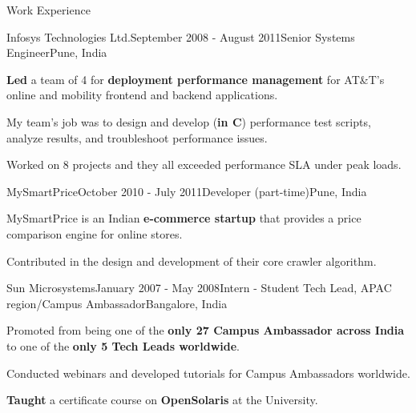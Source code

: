 \documentclass{resume} %
\begin{document}
\begin{rSection}{Work Experience}
\begin{rSubsection}{Infosys Technologies Ltd.}{September 2008 - August
2011}{Senior Systems Engineer}{Pune, India}
\item \textbf{Led} a team of 4 for \textbf{deployment performance management}
for AT\&T's online and mobility frontend and backend applications.
\begin{lsubSubsection}
\item My team's job was to design and develop (\textbf{in C}) performance
test scripts, analyze results, and troubleshoot performance issues.  
\item {Worked on 8 projects} and they all exceeded performance SLA under
peak loads.
\end{lsubSubsection}
\end{rSubsection}

\begin{rSubsection}{MySmartPrice}{October 2010 - July 2011}{Developer
(part-time)}{Pune, India} 
\item MySmartPrice is an Indian \textbf{e-commerce startup} that provides a
price comparison engine for online stores. 
\begin{lsubSubsection}
\item Contributed in the design and development of their core crawler algorithm. 
\end{lsubSubsection}
\end{rSubsection}

\begin{rSubsection}{Sun Microsystems}{January 2007 - May 2008}{Intern - Student
Tech Lead, APAC region/Campus Ambassador}{Bangalore, India}
\item Promoted from being one of the \textbf{only 27 Campus Ambassador across India}
to one of the \textbf{only 5 Tech Leads worldwide}.  
\begin{lsubSubsection}
\item Conducted webinars and developed tutorials for Campus Ambassadors
worldwide.
\item \textbf{Taught} a certificate course on \textbf{OpenSolaris} at the
  University.
\end{lsubSubsection}
\end{rSubsection}
\end{rSection}
\end{document}
